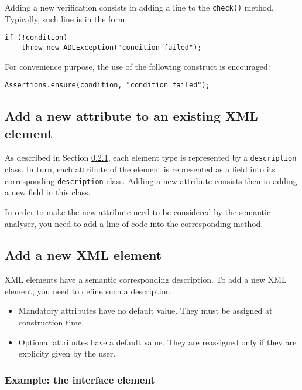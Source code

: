 \documentclass{article}
\newcommand{\code}[1]{\texttt{#1}}
\begin{document}
Adding a new verification consists in adding a line to the \code{check()} method. Typically, such line
is in the form:

\begin{lstlisting}
if (!condition)
	throw new ADLException("condition failed");
\end{lstlisting}

For convenience purpose, the use of the following construct is encouraged:

\begin{lstlisting}
Assertions.ensure(condition, "condition failed");
\end{lstlisting}



\subsection{Add a new attribute to an existing XML element}

As described in Section \ref{}, each element type is represented by a \code{description} class.
In turn, each attribute of the element is represented as a field into its corresponding \code{description} class.
Adding a new attribute consists then in adding a new field in this class.

In order to make the new attribute need to be considered by the semantic analyser, you need
to add a line of code into the corresponding method.



\subsection{Add a new XML element}

XML elements have a semantic corresponding description. To add a new XML element, you need to define such a description.

\begin{itemize}
  \item Mandatory attributes have no default value. They must be assigned at construction time.
  \item Optional attributes have a default value. They are reassigned only if they are explicity given by the user.
\end{itemize}

\subsubsection{Example: the interface element}
\end{document}
